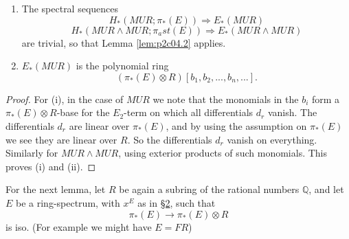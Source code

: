 \documentclass[../main]{subfiles}
\begin{document}
\begin{lemma}
\label{lem:p2c04.5}
\begin{enumerate}
    \item The spectral sequences
    $$H_\ast(MUR;\pi_\ast(E))\Longrightarrow E_\ast(MUR)$$
    $$H_\ast(MUR\wedge MUR; \pi_ast(E))\Longrightarrow E_\ast(MUR\wedge MUR)$$
    are trivial, so that Lemma \ref{lem:p2c04.2} applies.
    \item $E_\ast(MUR)$ is the polynomial ring 
    $$(\pi_\ast(E)\otimes R)[b_1,b_2,...,b_n,...].$$
\end{enumerate}
\end{lemma}
\begin{proof}
For (i), in the case of $MUR$ we note that the monomials in the $b_i$ form a $\pi_\ast(E)\otimes R$-base for the $E_2$-term on which all differentials $d_r$ vanish. The differentials $d_r$ are linear over $\pi_\ast(E)$, and by using the assumption on $\pi_\ast(E)$ we see they are linear over $R$. So the differentials $d_r$ vanish on everything. Similarly for $MUR\wedge MUR$, using exterior products of such monomials. This proves (i) and (ii).
\end{proof}

For the next lemma, let $R$ be again a subring of the rational numbers $\mathbb{Q}$, and let $E$ be a ring-spectrum, with $x^E$ as in \hyperref[sec:p2c2]{\S 2}, such that 
$$\pi_\ast(E)\longrightarrow\pi_\ast(E)\otimes R$$
is iso. (For example we might have $E=FR$)
\end{document}
